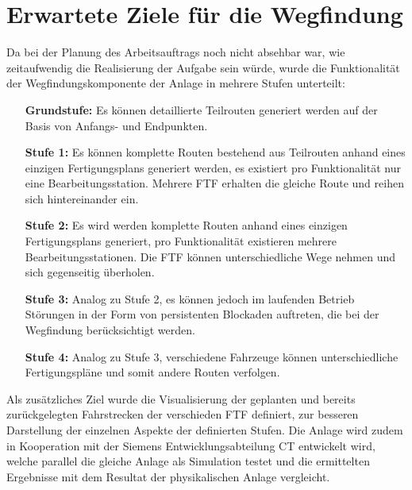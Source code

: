 \section{Erwartete Ziele für die Wegfindung}
	Da bei der Planung des Arbeitsauftrags noch nicht absehbar war, wie zeitaufwendig die Realisierung der Aufgabe sein würde, wurde die Funktionalität der Wegfindungskomponente der Anlage in mehrere Stufen unterteilt:
	\begin{enumerate}
		\item[\textbf{Grundstufe:}] Es können detaillierte Teilrouten generiert werden auf der Basis von Anfangs- und Endpunkten.
		\item[\textbf{Stufe 1:}] Es können komplette Routen bestehend aus Teilrouten anhand eines einzigen Fertigungsplans generiert werden, es existiert pro Funktionalität nur eine Bearbeitungsstation. Mehrere \ac{FTF} erhalten die gleiche Route und reihen sich hintereinander ein.
		\item[\textbf{Stufe 2:}] Es wird werden komplette Routen anhand eines einzigen Fertigungsplans generiert, pro Funktionalität existieren mehrere Bearbeitungsstationen. Die \ac{FTF} können unterschiedliche Wege nehmen und sich gegenseitig überholen.
		\item[\textbf{Stufe 3:}] Analog zu Stufe 2, es können jedoch im laufenden Betrieb Störungen in der Form von persistenten Blockaden auftreten, die bei der Wegfindung berücksichtigt werden.
		\item[\textbf{Stufe 4:}] Analog zu Stufe 3, verschiedene Fahrzeuge können unterschiedliche Fertigungspläne und somit andere Routen verfolgen.
	\end{enumerate}
	Als zusätzliches Ziel wurde die Visualisierung der geplanten und bereits zurückgelegten Fahrstrecken der verschieden \ac{FTF} definiert, zur besseren Darstellung der einzelnen Aspekte der definierten Stufen. Die Anlage wird zudem in Kooperation mit der Siemens Entwicklungsabteilung \ac{CT} entwickelt wird, welche parallel die gleiche Anlage als Simulation testet und die ermittelten Ergebnisse mit dem Resultat der physikalischen Anlage vergleicht.
	